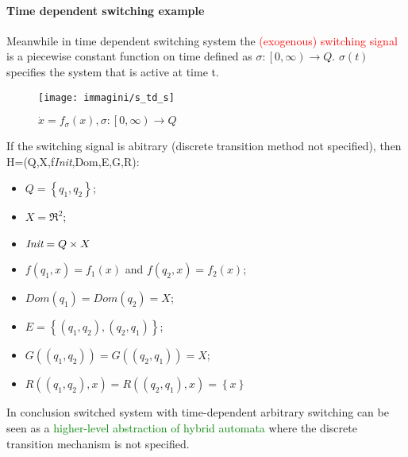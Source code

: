 \paragraph{Time dependent switching example} 
Meanwhile in time dependent switching system the \textcolor{red}{(exogenous) switching signal} is a piecewise constant function on time defined as $\sigma \colon \left[0,\infty\right) \to Q$. $\sigma(t)$ specifies the system that is active at time t.
\begin{figure}[H]
	\centering
	\texttt{[image: immagini/s\_td\_s]}
	\caption{$\dot{x}=f_{\sigma}(x), \sigma \colon \left[0,\infty\right) \to Q$} 
	\label{fig:stds}
\end{figure}
If the switching signal is abitrary (discrete transition method not specified), then H=(Q,X,f\textit{Init},Dom,E,G,R):
 \begin{itemize}
	\item $Q=\left\{q_1,q_2\right\}$;
	\item $X=\Re^2$;
	\item $\emph{Init}=Q \times X$ 
	\item $f(q_1,x)=f_1(x)$ and $f(q_2,x)=f_2(x)$; 
	\item $Dom(q_1)=Dom(q_2)=X$;
	\item $E=\left\{(q_1,q_2),(q_2,q_1)\right\}$;
	\item$G((q_1,q_2))=G((q_2,q_1))=X$;
	\item$R((q_1,q_2),x)=R((q_2,q_1),x)=\left\{x \right\}$
\end{itemize}
In conclusion switched system with time-dependent arbitrary switching can be seen as a \textcolor{green}{higher-level abstraction of hybrid automata} where the discrete transition mechanism is not specified.
